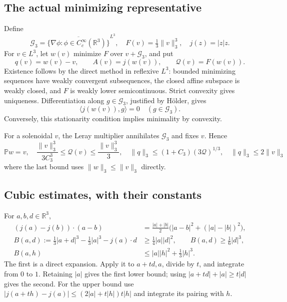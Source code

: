 \documentclass[11pt,a4paper]{article}
\theoremstyle{definition}\newtheorem{definition}[theorem]{Definition}
\theoremstyle{remark}\newtheorem{remark}[theorem]{Remark}
\newcommand{\R}{\mathbb R}
\newcommand{\G}{\mathcal G_3}
\newcommand{\Q}{\mathcal Q}
\newcommand{\PP}{\mathbb P}
\newcommand{\norm}[1]{\lVert #1\rVert}
\newcommand{\ip}[2]{\langle #1,#2\rangle}
\numberwithin{equation}{section}
\begin{document}
\subsection{The actual minimizing representative}
Define
\begin{equation}\label{eq:defs}
 \G=\overline{\{\nabla\phi:\phi\in C_c^\infty(\R^3)\}}^{L^3},
 \quad F(v)=\tfrac13\norm v_3^3,
 \quad j(z)=|z|z.
\end{equation}
For $v\in L^3$, let $w(v)$ minimize $F$ over $v+\G$, and put
\begin{equation}\label{eq:objects}
 q(v)=w(v)-v,\qquad A(v)=j(w(v)),\qquad \Q(v)=F(w(v)).
\end{equation}
Existence follows by the direct method in reflexive $L^3$: bounded minimizing sequences have weakly convergent subsequences, the closed affine subspace is weakly closed, and $F$ is weakly lower semicontinuous. Strict convexity gives uniqueness. Differentiation along $g\in\G$, justified by H\"older, gives
\begin{equation}\label{eq:stationarity}
 \ip{j(w(v))}{g}=0\quad(g\in\G).
\end{equation}
Conversely, this stationarity condition implies minimality by convexity.

For a solenoidal $v$, the Leray multiplier annihilates $\G$ and fixes $v$. Hence
\begin{equation}\label{eq:coercivity}
 \PP w=v,\quad
 \frac{\norm v_3^3}{3C_3^3}\le\Q(v)\le\frac{\norm v_3^3}{3},\quad
 \norm q_3\le(1+C_3)(3\Q)^{1/3},\quad \norm q_3\le2\norm v_3
\end{equation}
where the last bound uses $\norm w_3\le\norm v_3$ directly.

\subsection{Cubic estimates, with their constants}
For $a,b,d\in\R^3$,
\begin{align}
 (j(a)-j(b))\cdot(a-b)
 &=\frac{|a|+|b|}{2}\bigl(|a-b|^2+(|a|-|b|)^2\bigr),\label{eq:mono}\\
 B(a,d):=\tfrac13|a+d|^3-\tfrac13|a|^3-j(a)\cdot d
 &\ge\tfrac14|a||d|^2,\qquad B(a,d)\ge\tfrac16|d|^3,\label{eq:Bbelow}\\
 B(a,h)&\le |a||h|^2+\tfrac13|h|^3.\label{eq:Babove}
\end{align}
The first is a direct expansion. Apply it to $a+td,a$, divide by $t$, and integrate from $0$ to $1$. Retaining $|a|$ gives the first lower bound; using $|a+td|+|a|\ge t|d|$ gives the second. For the upper bound use
$|j(a+th)-j(a)|\le(2|a|+t|h|)t|h|$ and integrate its pairing with $h$.
\end{document}
